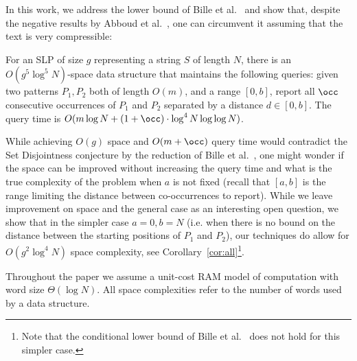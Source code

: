 In this work, we address the lower bound of Bille et al.~\cite{bille2022gapped} and show that, despite the negative results by Abboud et al.~\cite{abboud2017fine}, one can circumvent it assuming that the text is very compressible:

\begin{theorem}\label{thm:close_co_occurrences}
For an SLP of size $g$ representing a string $S$ of length $N$, there is an $O(g^5\log^5 N)$-space data structure that maintains the following queries: given two patterns $P_1, P_2$ both of length $O(m)$, and a range $[0,b]$, report all $\occ$ consecutive occurrences of $P_1$ and $P_2$ separated by a distance $d \in [0,b]$. The query time is $O(m\log N + (1+\occ) \cdot \log^4 N \log \log N)$. 
\end{theorem}


While achieving $O(g)$ space and $O(m+\occ)$ query time would contradict the Set Disjointness conjecture by the reduction of Bille et al.~\cite{bille2022gapped}, one might wonder if the space can be improved without increasing the query time and what is the true complexity of the problem when $a$ is not fixed (recall that $[a,b]$ is the range limiting the distance between co-occurrences to report). While we leave improvement on space and the general case as an interesting open question, we show that in the simpler case $a = 0, b = N$ (i.e. when there is no bound on the distance between the starting positions of $P_1$ and $P_2$), our techniques do allow for $O(g^2\log^4 N)$ space complexity, see Corollary~\ref{cor:all}\footnote{Note that the conditional lower bound of Bille et al.~\cite{bille2022gapped} does not hold for this simpler case.}.

Throughout the paper we assume a unit-cost RAM model of computation with word size $\Theta(\log N)$. All space
complexities refer to the number of words used by a data structure.
